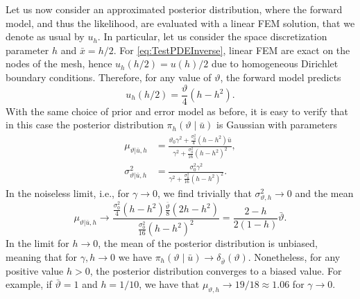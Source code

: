 \documentclass{siamart1116}
\numberwithin{theorem}{section}
\renewcommand{\theta}{\vartheta}
\begin{document}
Let us now consider an approximated posterior distribution, where the forward model, and thus the likelihood, are evaluated with a linear FEM solution, that we denote as usual by $u_h$. In particular, let us consider the space discretization parameter $h$ and $\bar x = h / 2$. For \eqref{eq:TestPDEInverse}, linear FEM are exact on the nodes of the mesh, hence $u_h(h / 2) = u(h) / 2$ due to homogeneous Dirichlet boundary conditions. Therefore, for any value of $\theta$, the forward model predicts
\begin{equation}
	u_h(h / 2) = \frac{\theta}{4}(h - h^2).
\end{equation}
With the same choice of prior and error model as before, it is easy to verify that in this case the posterior distribution $\pi_h(\theta\mid\bar u)$ is Gaussian with parameters
\begin{equation}
\begin{aligned}
	\mu_{\theta|\bar u, h} &= \frac{\theta_0 \gamma^2 + \frac{\sigma_0^2}{4}(h - h^2)\bar u}{\gamma^2 + \frac{\sigma_0^2}{16}(h - h^2)^2}, \\
	\sigma^2_{\theta|\bar u, h} &= \frac{\sigma_0^2\gamma^2}{\gamma^2 + \frac{\sigma_0^2}{16}(h - h^2)^2}.
\end{aligned}
\end{equation}
In the noiseless limit, i.e., for $\gamma \to 0$, we find trivially that $\sigma_{\theta, h}^2 \to 0$ and the mean 
\begin{equation}
	\mu_{\theta|\bar u, h} \to \frac{\frac{\sigma_0^2}{4}(h - h^2)\frac{\bar \theta}{8}(2h - h^2)}{\frac{\sigma_0^2}{16}(h - h^2)^2} = \frac{2 - h}{2(1 - h)}\bar \theta.
\end{equation}
In the limit for $h \to 0$, the mean of the posterior distribution is unbiased, meaning that for $\gamma, h \to 0$ we have $\pi_h(\theta\mid \bar u) \to \delta_{\bar \theta}(\theta)$. Nonetheless, for any positive value $h > 0$, the posterior distribution converges to a biased value. For example, if $\bar \theta = 1$ and $h = 1 / 10$, we have that $\mu_{\theta, h} \to 19 / 18 \approx 1.06$ for $\gamma \to 0$.
\end{document}
